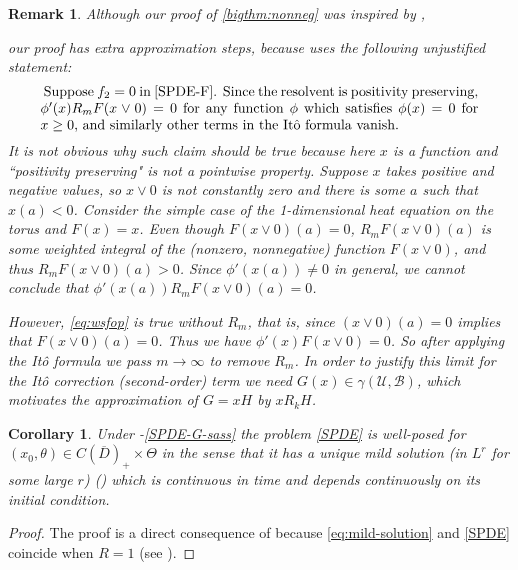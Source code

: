 \documentclass[final]{amsart}
\newtheorem{cor}[thm]{Corollary}
\newtheorem{rem}[thm]{Remark}
\numberwithin{thm}{section}
\numberwithin{equation}{section}
\newcommand{\U}{\mathcal{U}}
\newcommand{\B}{\mathcal{B}}
\newcommand{\cdom}{C(\overline D)_+}
\begin{document}
\begin{rem}\label{rmk:extra-approx}
    Although our proof of  \ref{bigthm:nonneg} was inspired by \cite[Lemma 3.1]{nhu-positivity},
    
     our proof has extra approximation steps, because  
     \cite{nhu-positivity} uses the following unjustified statement: 
     \begin{equation}\label{eq:wsfop}
     \parbox{11cm}{
     \textrm{
     Suppose $f_2 = 0$ in \Cref{SPDE-F}. Since the resolvent is positivity preserving, $\phi'(x)R_mF(x \vee 0) = 0$
     for any function $\phi$ which satisfies $\phi(x) = 0$ for $x \geq 0$, and similarly other terms in the It\^o formula vanish.} 
     }
     \end{equation}
     It is not obvious why such claim should be true because here $x$ is a function and ``positivity preserving" is not a pointwise property. Suppose $x$ takes positive and negative values, so $x \vee 0$ is not constantly zero and there is some $a$ such that $x(a) < 0$. Consider the simple case of the 1-dimensional heat equation on the torus and $F(x) = x$. Even though $F(x \vee 0)(a) = 0$, $R_mF(x \vee 0)(a)$ is some weighted integral of the (nonzero, nonnegative) function $F(x \vee 0)$, and thus $R_mF(x \vee 0)(a) > 0$. Since $\phi'(x(a)) \neq 0$ in general, we cannot conclude that $\phi'(x(a))R_mF(x\vee 0)(a) = 0$.
     
     
     
     
     
    However, \eqref{eq:wsfop} is true without $R_m$, that is, since $(x \vee 0)(a) = 0$ implies that $F(x \vee 0)(a) = 0$. Thus we have $\phi'(x)F(x \vee 0) = 0$. So after applying the It\^ o formula we pass $m \to \infty$ to remove $R_m$. In order to justify this limit for the It\^ o correction (second-order) term we need $G(x) \in \gamma(\U,\B)$, which motivates the approximation of  $G = xH$ by $xR_kH$.
\end{rem}

\begin{cor}\label{well-posedness-of-SPDE}
Under -\ref{SPDE-G-sass}
    the problem \eqref{SPDE} is well-posed for $(x_0,\theta) \in \cdom \times \Theta$ in the sense that it has a unique mild solution (in $L^r$ for some large $r$) () which is continuous in time and depends continuously on its initial condition.
\end{cor}
\begin{proof}
    The proof is a direct consequence of  because \eqref{eq:mild-solution} and \eqref{SPDE} coincide when $R = 1$ (see ).
\end{proof}
\end{document}
